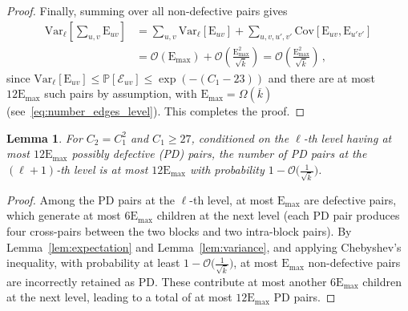 \documentclass[journal]{IEEEtran}
\newcommand{\rEm}{\mathrm{E}_{\max}}
\newcommand{\Var}{\mathrm{Var}}
\newcommand{\Cov}{\mathrm{Cov}}
\newtheorem{lemma}{Lemma}
\theoremstyle{definition}
\theoremstyle{definition}
\newcommand{\Ec}{\mathcal{E}}
\newcommand{\PP}{\mathbb{P}}
\newcommand{\rE}{\mathrm{E}}
\newcommand{\kb}{\overline{k}}
\newcommand{\bigO}{\mathcal{O}}
\begin{document}
\begin{proof}
    Finally, summing over all non-defective pairs gives 
\begin{align*}
    \Var_{\ell}\left[ \sum_{u,v} \rE_{uv} \right] 
    &= \sum_{u,v} \Var_{\ell} \left[\rE_{uv} \right] 
       + \sum_{u,v, u',v'} \Cov \left[ \rE_{uv}, \rE_{u'v'} \right] \\
    &= \bigO(\rEm) + \bigO \left( \frac{\rEm^2}{\sqrt{\kb}}\right) 
    = \bigO \left( \frac{\rEm^2}{\sqrt{\kb}}\right) \, ,
\end{align*}
since $\Var_{\ell}[\rE_{uv}] \leq \PP[\Ec_{uv}] \leq \exp(-(C_1 - 23))$ 
and there are at most $12\rEm$ such pairs by assumption, with 
$\rEm = \Omega(\kb)$ (see~\eqref{eq:number_edges_level}). 
This completes the proof.
\end{proof}




\begin{lemma}
\label{lem: bounds_size_PD}
For \( C_2 = C_1^2 \) and \( C_1 \geq 27 \), conditioned on the \( \ell \)-th level having at most \( 12\rEm \) possibly defective (PD) pairs, the number of PD pairs at the \( (\ell+1) \)-th level is at most \( 12\rEm \) with probability \( 1 - \bigO \big( \tfrac{1}{\sqrt{\kb}} \big) \).
\end{lemma}

\begin{proof}
Among the PD pairs at the \( \ell \)-th level, at most \( \rEm \) are defective pairs, which generate at most \( 6\rEm \) children at the next level (each PD pair produces four cross-pairs between the two blocks and two intra-block pairs).  
By Lemma~\ref{lem:expectation} and Lemma~\ref{lem:variance}, and applying Chebyshev's inequality, with probability at least \( 1 - \bigO \big( \tfrac{1}{\sqrt{\kb}}\big) \), at most \( \rEm \) non-defective pairs are incorrectly retained as PD.  
These contribute at most another \( 6\rEm \) children at the next level, leading to a total of at most \( 12\rEm \) PD pairs.
\end{proof}
\end{document}
